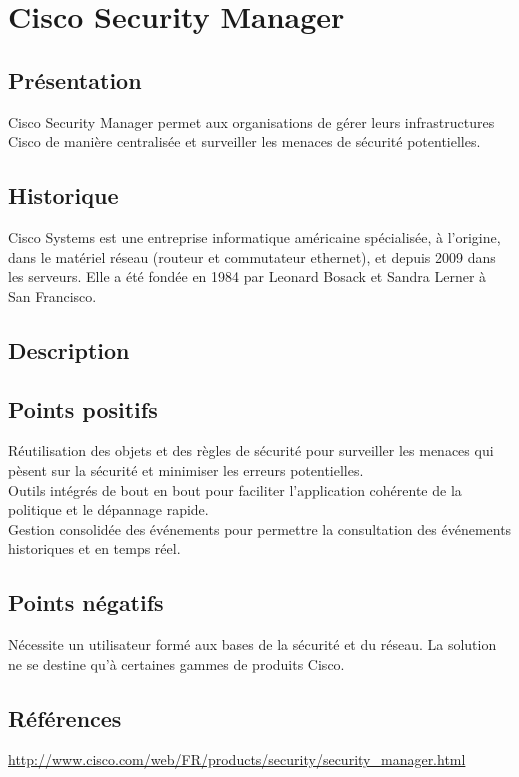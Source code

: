 \section{Cisco Security Manager}
\thispagestyle{plain}
\subsection{Présentation}
Cisco Security Manager permet aux organisations de gérer leurs infrastructures Cisco de manière centralisée et surveiller les menaces de sécurité potentielles.

\subsection{Historique}
Cisco Systems est une entreprise informatique américaine spécialisée, à l’origine, dans le matériel réseau (routeur et commutateur ethernet), et depuis 2009 dans les serveurs. Elle a été fondée en 1984 par Leonard Bosack et Sandra Lerner à San Francisco.

\subsection{Description}

\subsection{Points positifs}
Réutilisation des objets et des règles de sécurité pour surveiller les menaces qui pèsent sur la sécurité et minimiser les erreurs potentielles.\\
Outils intégrés de bout en bout pour faciliter l'application cohérente de la politique et le dépannage rapide.\\
Gestion consolidée des événements pour permettre la consultation des événements historiques et en temps réel.\\

\subsection{Points négatifs}
Nécessite un utilisateur formé aux bases de la sécurité et du réseau.
La solution ne se destine qu’à certaines gammes de produits Cisco.

\subsection{Références}
\small
\noindent
\url{http://www.cisco.com/web/FR/products/security/security_manager.html}
\normalsize